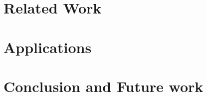 \documentclass[11pt]{ucthesis}
\begin{document}
\chapter{Related Work}
\label{chapter:related}


\chapter{Applications}
\label{chapter:app}



\chapter{Conclusion and Future work}
\label{chapter:summary}


%


  


\end{document}
